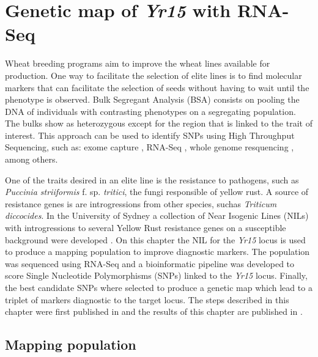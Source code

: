 
\chapter{Genetic map of \textit{Yr15} with RNA-Seq}
\label{yr15}
 
Wheat breeding programs aim to improve the wheat lines available for production.
One way to facilitate the selection of elite lines is to find molecular markers that can facilitate the selection of seeds without having to wait until the phenotype is observed.   
Bulk Segregant Analysis (BSA) consists on pooling the DNA of individuals with contrasting phenotypes \citep{Michelmore1991} on a segregating population. 
The bulks show as heterozygous except for the region that is linked to the trait of interest. 
This approach can be used to identify SNPs using High Throughput Sequencing, such as: exome capture \citep{Hodges2007}, RNA-Seq \citep{Pickrell2010}, whole genome resquencing \citep{Schneeberger2009}, among others. 

One of the traits desired in an elite line is the resistance to pathogens, such as \textit{Puccinia striiformis} f. sp.  \textit{tritici}, the fungi responsible of yellow rust.
A source of resistance genes is are introgressions from other species, suchas \textit{Triticum diccocides}. 
In the University of Sydney a collection of Near Isogenic Lines (NILs) with introgressions to several Yellow Rust resistance genes on a susceptible background were developed \citep{Wellings1998}. 
On this chapter the NIL for the \textit{Yr15} locus is used to produce a mapping population to improve diagnostic markers. 
The population was sequenced using RNA-Seq and a bioinformatic pipeline was developed to score Single Nucleotide Polymorphisms (SNPs) linked to the \textit{Yr15} locus.  
Finally, the best candidate SNPs where selected to produce a genetic map which lead to a triplet of markers diagnostic to the target locus. The steps described in this chapter were first published in \citet{Ramirez-Gonzalez2015c} and the results of this chapter are published in \citet{Ramirez-Gonzalez2015b}.

\section{Mapping population}


